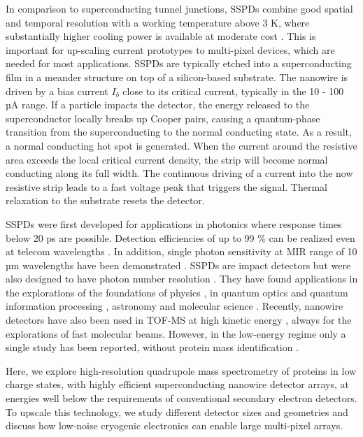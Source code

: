 \documentclass[12pt]{article}
\begin{document}
In comparison to superconducting tunnel junctions, SSPDs combine good spatial and temporal resolution with a working temperature above 3 K, where substantially higher cooling power is available at moderate cost \cite{Cristiano2015}. This is important for up-scaling current prototypes to multi-pixel devices, which are needed for most applications. SSPDs are typically etched into a superconducting film in a meander structure on top of a silicon-based substrate. The nanowire is driven by a bias current $I_b$ close to its critical current, typically in the 10 - 100 µA range. If a particle impacts the detector, the energy released to the superconductor locally breaks up Cooper pairs, causing a quantum-phase transition from the superconducting to the normal conducting state. As a result, a normal conducting hot spot is generated. When the current around the resistive area exceeds the local critical current density, the strip will become normal conducting along its full width. The continuous driving of a current into the now resistive strip leads to a fast voltage peak that triggers the signal. Thermal relaxation to the substrate resets the detector. 

SSPDs were first developed for applications in photonics \cite{Semenov2001} where response times below 20 ps \cite{Pernice2012,Korzh2020}  are possible. Detection efficiencies of up to 99 \% can be realized even at telecom wavelengths \cite{Zadeh2021}. In addition, single photon sensitivity at MIR range of 10 µm wavelengths have been demonstrated \cite{Verma2021}.  SSPDs are impact detectors but were also designed to have photon number resolution \cite{Divochiy2008}. They have found applications in the explorations of the foundations of physics \cite{Giustina2015, Shalm2015}, in quantum optics \cite{Takesue2007,Aker2022} and quantum information processing \cite{Zadeh2021,Mirhosseini2020}, astronomy \cite{Wollman2019} and molecular science \cite{Chen2017}. Recently, nanowire detectors have also been used in TOF-MS at high kinetic energy \cite{Ohkubo2008, Cristiano2015,Suzuki2008a,Suzuki2008b}, always for the explorations of fast molecular beams. However, in the low-energy regime only a single study has been reported, without protein mass identification \cite{Marksteiner2009}. 

Here, we explore high-resolution quadrupole mass spectrometry of proteins in low charge states, with highly efficient superconducting nanowire detector arrays, at energies well below the requirements of conventional secondary electron detectors. To upscale this technology, we study different detector sizes and geometries and discuss how low-noise cryogenic electronics can enable large multi-pixel arrays.
\end{document}
